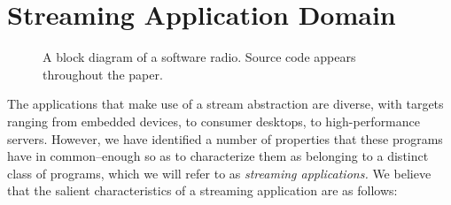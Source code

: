\section{Streaming Application Domain}
\label{sec:domain}

\begin{figure*}[t]
\centering
\vspace{-6pt}
\vspace{-10pt}
\caption{A block diagram of a software radio.  Source code appears throughout the paper.}
\vspace{-6pt}
\label{fig:radiodiagram}
\end{figure*}

The applications that make use of a stream abstraction are diverse,
with targets ranging from embedded devices, to consumer desktops, to
high-performance servers.  However, we have identified a number of
properties that these programs have in common--enough so as to
characterize them as belonging to a distinct class of programs, which
we will refer to as {\it streaming applications.}  We believe that the
salient characteristics of a streaming application are as follows:

